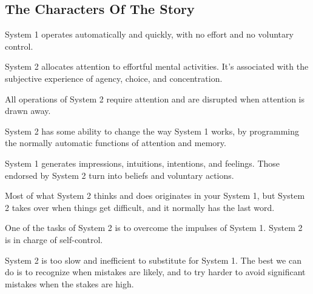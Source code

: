 \subsection*{The Characters Of The Story}
\bit
\item System 1 operates automatically and quickly, with no effort and no voluntary control.
\item System 2 allocates attention to effortful mental activities. It's associated with the subjective experience of
agency, choice, and concentration.
\item All operations of System 2 require attention and are disrupted when attention is drawn away.
\item System 2 has some ability to change the way System 1 works, by programming the normally automatic functions of
attention and memory.
\item System 1 generates impressions, intuitions, intentions, and feelings. Those endorsed by System 2 turn into
beliefs and voluntary actions.
\item Most of what System 2 thinks and does originates in your System 1, but System 2 takes over when things get
difficult, and it normally has the last word.
\item One of the tasks of System 2 is to overcome the impulses of System 1. System 2 is in charge of self-control.
\item System 2 is too slow and inefficient to substitute for System 1. The best we can do is to recognize when
mistakes are likely, and to try harder to avoid significant mistakes when the stakes are high.
\eit


